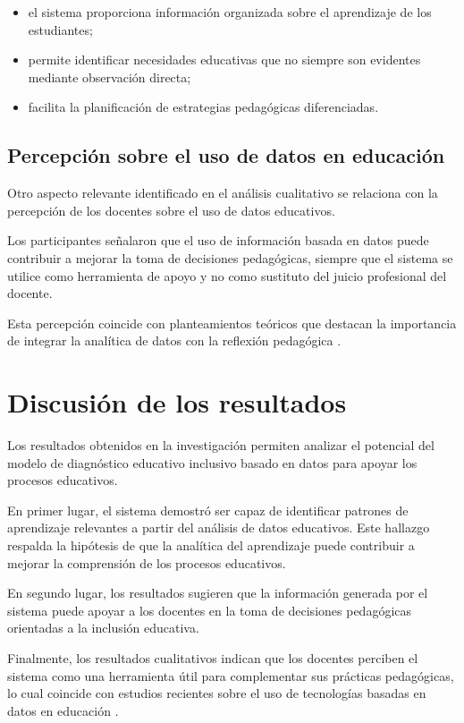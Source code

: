 \begin{refsection}
\begin{itemize}
\item el sistema proporciona información organizada sobre el aprendizaje de los estudiantes;
\item permite identificar necesidades educativas que no siempre son evidentes mediante observación directa;
\item facilita la planificación de estrategias pedagógicas diferenciadas.
\end{itemize}

\subsection{Percepción sobre el uso de datos en educación}

Otro aspecto relevante identificado en el análisis cualitativo se relaciona con la percepción de los docentes sobre el uso de datos educativos.

Los participantes señalaron que el uso de información basada en datos puede contribuir a mejorar la toma de decisiones pedagógicas, siempre que el sistema se utilice como herramienta de apoyo y no como sustituto del juicio profesional del docente.

Esta percepción coincide con planteamientos teóricos que destacan la importancia de integrar la analítica de datos con la reflexión pedagógica \parencite{selwyn2019}.

\section{Discusión de los resultados}

Los resultados obtenidos en la investigación permiten analizar el potencial del modelo de diagnóstico educativo inclusivo basado en datos para apoyar los procesos educativos.

En primer lugar, el sistema demostró ser capaz de identificar patrones de aprendizaje relevantes a partir del análisis de datos educativos. Este hallazgo respalda la hipótesis de que la analítica del aprendizaje puede contribuir a mejorar la comprensión de los procesos educativos.

En segundo lugar, los resultados sugieren que la información generada por el sistema puede apoyar a los docentes en la toma de decisiones pedagógicas orientadas a la inclusión educativa.

Finalmente, los resultados cualitativos indican que los docentes perciben el sistema como una herramienta útil para complementar sus prácticas pedagógicas, lo cual coincide con estudios recientes sobre el uso de tecnologías basadas en datos en educación \parencite{mandinach2016}.


\end{refsection}
